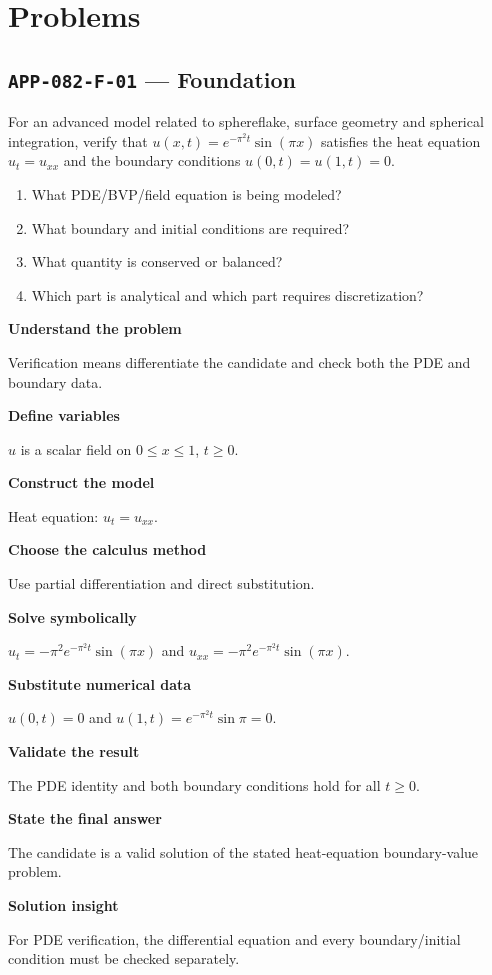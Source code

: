 \documentclass[11pt]{book}
\newcommand{\pid}[1]{\texttt{#1}}
\begin{document}
\section*{Problems}
\subsection*{\pid{APP-082-F-01} — Foundation}
\begin{problembox}
For an advanced model related to sphereflake, surface geometry and spherical integration, verify that $u(x,t)=e^{-\pi^2t}\sin(\pi x)$ satisfies the heat equation $u_t=u_{xx}$ and the boundary conditions $u(0,t)=u(1,t)=0$.
\end{problembox}
\begin{promptbox}\begin{enumerate}
\item What PDE/BVP/field equation is being modeled?
\item What boundary and initial conditions are required?
\item What quantity is conserved or balanced?
\item Which part is analytical and which part requires discretization?
\end{enumerate}\end{promptbox}
\begin{solutionbox}
\textbf{Understand the problem}\par Verification means differentiate the candidate and check both the PDE and boundary data.\par\medskip
\textbf{Define variables}\par $u$ is a scalar field on $0\le x\le1$, $t\ge0$.\par\medskip
\textbf{Construct the model}\par Heat equation: $u_t=u_{xx}$.\par\medskip
\textbf{Choose the calculus method}\par Use partial differentiation and direct substitution.\par\medskip
\textbf{Solve symbolically}\par $u_t=-\pi^2 e^{-\pi^2t}\sin(\pi x)$ and $u_{xx}=-\pi^2 e^{-\pi^2t}\sin(\pi x)$.\par\medskip
\textbf{Substitute numerical data}\par $u(0,t)=0$ and $u(1,t)=e^{-\pi^2t}\sin\pi=0$.\par\medskip
\textbf{Validate the result}\par The PDE identity and both boundary conditions hold for all $t\ge0$.\par\medskip
\textbf{State the final answer}\par The candidate is a valid solution of the stated heat-equation boundary-value problem.\par\medskip
\textbf{Solution insight}\par For PDE verification, the differential equation and every boundary/initial condition must be checked separately.\par\medskip
\end{solutionbox}
\end{document}
